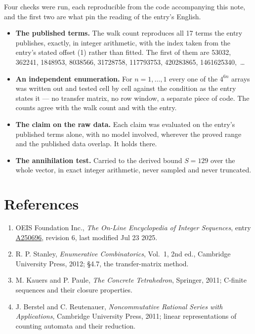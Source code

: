 \documentclass[11pt]{article}
\theoremstyle{definition}
\begin{document}
Four checks were run, each reproducible from the code accompanying this note, and the first two are what pin the reading of the entry's English.

\begin{itemize}

\item {\bfseries The published terms.} The walk count reproduces all 17 terms the entry publishes, exactly, in integer arithmetic, with the index taken from the entry's stated offset (1) rather than fitted. The first of them are 53032, 362241, 1848953, 8038566, 31728758, 117793753, 420283865, 1461625340,~\dots

\item {\bfseries An independent enumeration.} For $n = 1,\dots,1$ every one of the $4^{6n}$ arrays was written out and tested cell by cell against the condition as the entry states it --- no transfer matrix, no row window, a separate piece of code. The counts agree with the walk count and with the entry.

\item {\bfseries The claim on the raw data.} Each claim was evaluated on the entry's published terms alone, with no model involved, wherever the proved range and the published data overlap. It holds there.

\item {\bfseries The annihilation test.} Carried to the derived bound $S = 129$ over the whole vector, in exact integer arithmetic, never sampled and never truncated.

\end{itemize}

\section{References}

\begin{enumerate}

\item OEIS Foundation Inc., \emph{The On-Line Encyclopedia of Integer Sequences}, entry \href{https://oeis.org/A250696}{A250696}, revision 6, last modified Jul 23 2025.

\item R. P. Stanley, \emph{Enumerative Combinatorics}, Vol.~1, 2nd ed., Cambridge University Press, 2012; \S4.7, the transfer-matrix method.

\item M. Kauers and P. Paule, \emph{The Concrete Tetrahedron}, Springer, 2011; C-finite sequences and their closure properties.

\item J. Berstel and C. Reutenauer, \emph{Noncommutative Rational Series with Applications}, Cambridge University Press, 2011; linear representations of counting automata and their reduction.

\end{enumerate}
\end{document}
